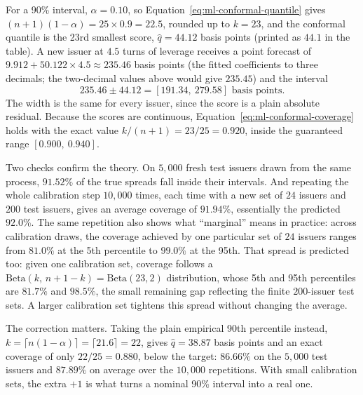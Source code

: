 \documentclass[../ai_in_finance]{subfiles}
\begin{document}
For a 90\% interval, $\alpha = 0.10$, so Equation~\eqref{eq:ml-conformal-quantile} gives $(n+1)(1-\alpha) = 25 \times 0.9 = 22.5$, rounded up to $k = 23$, and the conformal quantile is the 23rd smallest score, $\hat q = 44.12$ basis points (printed as $44.1$ in the table). A new issuer at $4.5$ turns of leverage receives a point forecast of $9.912 + 50.122 \times 4.5 \approx 235.46$ basis points (the fitted coefficients to three decimals; the two-decimal values above would give $235.45$) and the interval
\begin{equation*}
235.46 \pm 44.12 = [191.34,\ 279.58] \text{ basis points}.
\end{equation*}
The width is the same for every issuer, since the score is a plain absolute residual. Because the scores are continuous, Equation~\eqref{eq:ml-conformal-coverage} holds with the exact value $k/(n+1) = 23/25 = 0.920$, inside the guaranteed range $[0.900,\ 0.940]$.

Two checks confirm the theory. On $5{,}000$ fresh test issuers drawn from the same process, $91.52\%$ of the true spreads fall inside their intervals. And repeating the whole calibration step $10{,}000$ times, each time with a new set of $24$ issuers and $200$ test issuers, gives an average coverage of $91.94\%$, essentially the predicted $92.0\%$. The same repetition also shows what ``marginal'' means in practice: across calibration draws, the coverage achieved by one particular set of $24$ issuers ranges from $81.0\%$ at the 5th percentile to $99.0\%$ at the 95th. That spread is predicted too: given one calibration set, coverage follows a $\text{Beta}(k,\, n+1-k) = \text{Beta}(23, 2)$ distribution, whose 5th and 95th percentiles are $81.7\%$ and $98.5\%$, the small remaining gap reflecting the finite $200$-issuer test sets. A larger calibration set tightens this spread without changing the average.

The correction matters. Taking the plain empirical 90th percentile instead, $k = \lceil n(1-\alpha) \rceil = \lceil 21.6 \rceil = 22$, gives $\hat q = 38.87$ basis points and an exact coverage of only $22/25 = 0.880$, below the target: $86.66\%$ on the $5{,}000$ test issuers and $87.89\%$ on average over the $10{,}000$ repetitions. With small calibration sets, the extra $+1$ is what turns a nominal 90\% interval into a real one.
\end{document}

